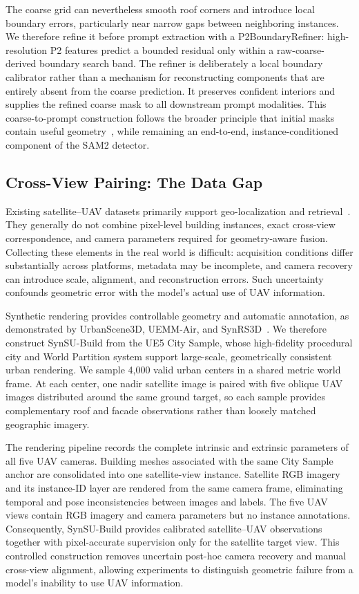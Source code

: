 \documentclass[letterpaper,journal]{IEEEtran}
\begin{document}
The coarse grid can nevertheless smooth roof corners and introduce local boundary errors, particularly near narrow gaps between neighboring instances. We therefore refine it before prompt extraction with a P2BoundaryRefiner: high-resolution P2 features predict a bounded residual only within a raw-coarse-derived boundary search band. The refiner is deliberately a local boundary calibrator rather than a mechanism for reconstructing components that are entirely absent from the coarse prediction. It preserves confident interiors and supplies the refined coarse mask to all downstream prompt modalities. This coarse-to-prompt construction follows the broader principle that initial masks contain useful geometry~\cite{ref_pointrend,ref_cascadepsp,ref_segrefiner,ref_samrefiner}, while remaining an end-to-end, instance-conditioned component of the SAM2 detector.

\subsection{Cross-View Pairing: The Data Gap}

Existing satellite--UAV datasets primarily support geo-localization and retrieval~\cite{ref_unigeo,ref_university}. They generally do not combine pixel-level building instances, exact cross-view correspondence, and camera parameters required for geometry-aware fusion. Collecting these elements in the real world is difficult: acquisition conditions differ substantially across platforms, metadata may be incomplete, and camera recovery can introduce scale, alignment, and reconstruction errors. Such uncertainty confounds geometric error with the model's actual use of UAV information.

Synthetic rendering provides controllable geometry and automatic annotation, as demonstrated by UrbanScene3D, UEMM-Air, and SynRS3D~\cite{ref_urbanscene3d,ref_uemmair,ref_synrs3d}. We therefore construct SynSU-Build from the UE5 City Sample, whose high-fidelity procedural city and World Partition system support large-scale, geometrically consistent urban rendering. We sample 4,000 valid urban centers in a shared metric world frame. At each center, one nadir satellite image is paired with five oblique UAV images distributed around the same ground target, so each sample provides complementary roof and facade observations rather than loosely matched geographic imagery.

The rendering pipeline records the complete intrinsic and extrinsic parameters of all five UAV cameras. Building meshes associated with the same City Sample anchor are consolidated into one satellite-view instance. Satellite RGB imagery and its instance-ID layer are rendered from the same camera frame, eliminating temporal and pose inconsistencies between images and labels. The five UAV views contain RGB imagery and camera parameters but no instance annotations. Consequently, SynSU-Build provides calibrated satellite--UAV observations together with pixel-accurate supervision only for the satellite target view. This controlled construction removes uncertain post-hoc camera recovery and manual cross-view alignment, allowing experiments to distinguish geometric failure from a model's inability to use UAV information.
\end{document}
